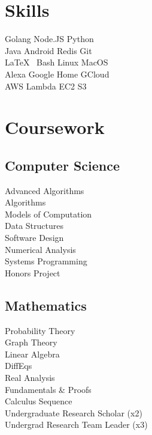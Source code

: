 \documentclass[]{deedy-resume-openfont}
\begin{document}
\begin{minipage}[t]{0.33\textwidth}
\section{Skills}
Golang \textbullet{} Node.JS \textbullet{} Python  \\
Java \textbullet{} Android  \textbullet{} Redis \textbullet{} Git \\
\LaTeX\ \textbullet{} Bash \textbullet{} Linux \textbullet{} MacOS \\
Alexa \textbullet{} Google Home \textbullet{} GCloud \\
AWS \textbullet{} Lambda \textbullet{} EC2 \textbullet{} S3 \\
\sectionsep



\vspace{8pt}

\section{Coursework}
\subsection{Computer Science}
Advanced Algorithms \\
Algorithms \\
Models of Computation \\
Data Structures \\
Software Design \\
Numerical Analysis \\
Systems Programming\\
Honors Project \\
\sectionsep

\subsection{Mathematics}
Probability Theory \\
Graph Theory \\
Linear Algebra \\
DiffEqs \\
Real Analysis \\
Fundamentals \& Proofs \\
Calculus Sequence \\
Undergraduate Research Scholar (x2) \\
Undergrad Research Team Leader (x3) \\
\sectionsep



\end{minipage}
\end{document}
